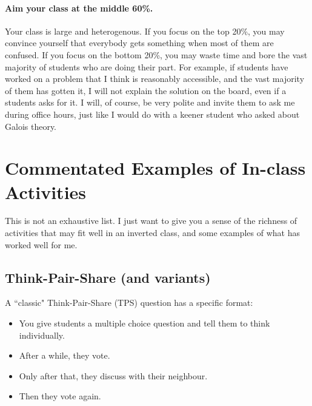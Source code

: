 \documentclass[11pt]{article}
\begin{document}
	\paragraph{Aim your class at the middle 60\%.}  Your class is large and heterogenous.  If you focus on the top 20\%, you may convince yourself that everybody gets something when most of them are confused.  If you focus on the bottom 20\%, you may waste time and bore the vast majority of students who are doing their part.    For example, if students have worked on a problem that I think is reasonably accessible, and the vast majority of them has gotten it, I will not explain the solution on the board, even if a students asks for it.  I will, of course, be very polite and invite them to ask me during office hours, just like I would do with a keener student who asked about Galois theory.

\newpage

\section[3. Commentated Examples of In-class Activities]{Commentated Examples of In-class Activities} \label{sec:activities}

This is not an exhaustive list.  I just want to give you a sense of the richness of activities that may fit well in an inverted class, and some examples of what has worked well for me.

\subsection{Think-Pair-Share (and variants)}

A ``classic" Think-Pair-Share (TPS)  question has a specific format:
\begin{itemize}
	\item  You give students a multiple choice question and tell them to think individually.
	\item  After a while, they vote.
	\item  Only after that, they discuss with their neighbour.
	\item Then they vote again.
\end{itemize}
\end{document}
